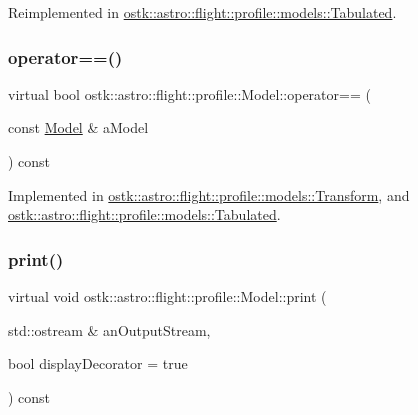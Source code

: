 Reimplemented in \hyperlink{classostk_1_1astro_1_1flight_1_1profile_1_1models_1_1_tabulated_a7d1f3f2024628e03eee408eaa1cd1a9b}{ostk\+::astro\+::flight\+::profile\+::models\+::\+Tabulated}.

\mbox{\label{classostk_1_1astro_1_1flight_1_1profile_1_1_model_a87f7ca747d79619e4b4bc04aa6a9252a}} 
\subsubsection{\texorpdfstring{operator==()}{operator==()}}
{\footnotesize\ttfamily virtual bool ostk\+::astro\+::flight\+::profile\+::\+Model\+::operator== (\begin{DoxyParamCaption}\item[{const \hyperlink{classostk_1_1astro_1_1flight_1_1profile_1_1_model}{Model} \&}]{a\+Model }\end{DoxyParamCaption}) const\hspace{0.3cm}{\ttfamily [pure virtual]}}



Implemented in \hyperlink{classostk_1_1astro_1_1flight_1_1profile_1_1models_1_1_transform_ad49694ca5cfb4fabf17ac063d9953fb0}{ostk\+::astro\+::flight\+::profile\+::models\+::\+Transform}, and \hyperlink{classostk_1_1astro_1_1flight_1_1profile_1_1models_1_1_tabulated_a5fd04ff2470cfe517bcb94e70fdb80fd}{ostk\+::astro\+::flight\+::profile\+::models\+::\+Tabulated}.

\mbox{\label{classostk_1_1astro_1_1flight_1_1profile_1_1_model_ad9bb86b1869150e2bd970e9fa59ce36e}} 
\subsubsection{\texorpdfstring{print()}{print()}}
{\footnotesize\ttfamily virtual void ostk\+::astro\+::flight\+::profile\+::\+Model\+::print (\begin{DoxyParamCaption}\item[{std\+::ostream \&}]{an\+Output\+Stream,  }\item[{bool}]{display\+Decorator = {\ttfamily true} }\end{DoxyParamCaption}) const\hspace{0.3cm}{\ttfamily [pure virtual]}}



